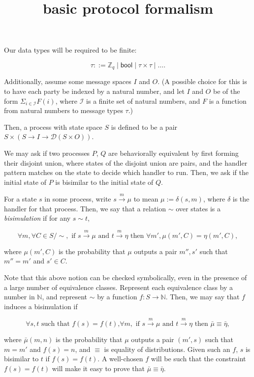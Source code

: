\documentclass{article}
\title {basic protocol formalism}
\begin{document}
\maketitle

Our data types will be required to be finite:

\[ \tau ::= \mathbb{Z}_{q} \mid \textsf{bool} \mid \tau \times \tau \mid \dots. \]

Additionally, assume some message spaces $I$ and $O$. (A possible choice for this is to have each party be indexed by a natural number, and let $I$ and $O$ be of the form $\Sigma_{i \in \mathcal{I}} F(i)$, where $\mathcal{I}$ is a finite set of natural numbers, and $F$ is a function from natural numbers to message types $\tau$.)

Then, a process with state space $S$ is defined to be a pair $S \times (S \to I \to \mathcal{D}(S \times O))$.

We may ask if two processes $P$, $Q$ are behaviorally equivalent by first forming their disjoint union, where states of the disjoint union are pairs, and the handler pattern matches on the state to decide which handler to run. Then, we ask if the initial state of $P$ is bisimilar to the initial state of $Q$.

For a state $s$ in some process, write $s \xrightarrow{m} \mu$ to mean $\mu := \delta (s,m)$, where $\delta$ is the handler for that process. Then, we say that a relation $\sim$ over states is a \emph{bisimulation} if for any $s \sim t$,

\[ \forall m, \forall C \in S / \sim, \text{ if } s \xrightarrow{m} \mu \text{ and } t \xrightarrow{m} \eta \text{ then }  \forall m', \mu(m',C) = \eta(m',C),\]

where $\mu(m',C)$ is the probability that $\mu$ outputs a pair $m'', s'$ such that $m'' = m'$ and $s' \in C$.


Note that this above notion can be checked symbolically, even in the presence of a large number of equivalence classes. Represent each equivalence class by a number in $\mathbb{N}$, and represent $\sim$ by a function $f : S \to \mathbb{N}$. Then, we may say that $f$ induces a bisimulation if

\[ \forall s,t \text{ such that $f(s) = f(t)$,} \forall m, \text{ if } s \xrightarrow{m} \mu \text{ and } t \xrightarrow{m} \eta \text{ then } \bar{\mu} \equiv \bar{\eta},\]

where $\bar{\mu}(m, n)$ is the probability that $\mu$ outputs a pair $(m', s)$ such that $m = m'$ and $f(s) = n$, and $\equiv$ is equality of distributions. Given such an $f$, $s$ is bisimilar to $t$ if $f(s) = f(t)$. A well-chosen $f$ will be such that the constraint $f(s) = f(t)$ will make it easy to prove that $\bar{\mu} \equiv \bar{\eta}$.
\end{document}
